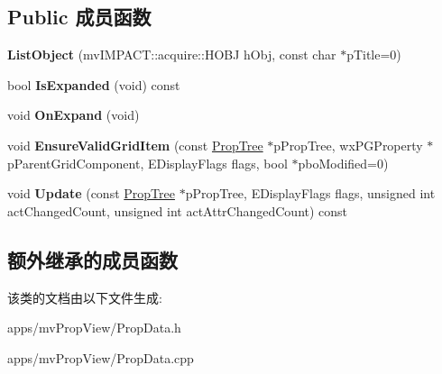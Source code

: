\subsection*{Public 成员函数}
\begin{DoxyCompactItemize}
\item 
\hypertarget{class_list_object_a669b31b0e3be85c2b7edc54bece9cb2c}{{\bfseries List\+Object} (mv\+I\+M\+P\+A\+C\+T\+::acquire\+::\+H\+O\+B\+J h\+Obj, const char $\ast$p\+Title=0)}\label{class_list_object_a669b31b0e3be85c2b7edc54bece9cb2c}

\item 
\hypertarget{class_list_object_a0e7eced7ab206509a11586d57ee839f0}{bool {\bfseries Is\+Expanded} (void) const }\label{class_list_object_a0e7eced7ab206509a11586d57ee839f0}

\item 
\hypertarget{class_list_object_a04a590c236b6327e32016267d9c64691}{void {\bfseries On\+Expand} (void)}\label{class_list_object_a04a590c236b6327e32016267d9c64691}

\item 
\hypertarget{class_list_object_a33b9f7a26fbe710243578473cd8686fc}{void {\bfseries Ensure\+Valid\+Grid\+Item} (const \hyperlink{class_prop_tree}{Prop\+Tree} $\ast$p\+Prop\+Tree, wx\+P\+G\+Property $\ast$p\+Parent\+Grid\+Component, E\+Display\+Flags flags, bool $\ast$pbo\+Modified=0)}\label{class_list_object_a33b9f7a26fbe710243578473cd8686fc}

\item 
\hypertarget{class_list_object_aaf8a6ab623efd0aca0e9ec1b2b711fe1}{void {\bfseries Update} (const \hyperlink{class_prop_tree}{Prop\+Tree} $\ast$p\+Prop\+Tree, E\+Display\+Flags flags, unsigned int act\+Changed\+Count, unsigned int act\+Attr\+Changed\+Count) const }\label{class_list_object_aaf8a6ab623efd0aca0e9ec1b2b711fe1}

\end{DoxyCompactItemize}
\subsection*{额外继承的成员函数}


该类的文档由以下文件生成\+:\begin{DoxyCompactItemize}
\item 
apps/mv\+Prop\+View/Prop\+Data.\+h\item 
apps/mv\+Prop\+View/Prop\+Data.\+cpp\end{DoxyCompactItemize}
